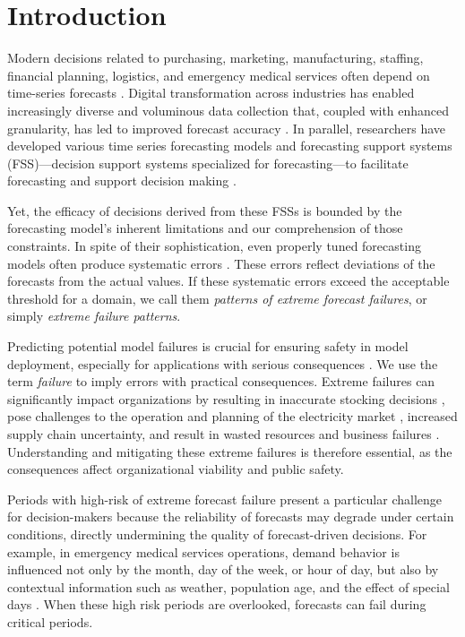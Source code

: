 \documentclass[]{interact}
\theoremstyle{plain}
\theoremstyle{definition}
\theoremstyle{remark}
\begin{document}

\section{Introduction}
\label{sec:Intro}
Modern decisions related to purchasing, marketing, manufacturing, staffing, financial planning, logistics, and emergency medical services often depend on time-series forecasts \citep{abreu2023}. Digital transformation across industries has enabled increasingly diverse and voluminous data collection that, coupled with enhanced granularity, has led to improved forecast accuracy \citep{chae2024}. In parallel, researchers have developed various time series forecasting models and forecasting support systems (FSS)---decision support systems specialized for forecasting---to facilitate forecasting and support decision making \citep{petropoulos2022}.

Yet, the efficacy of decisions derived from these FSSs is bounded by the forecasting model's inherent limitations and our comprehension of those constraints. In spite of their sophistication, even properly tuned forecasting models often produce systematic errors \citep{eyuboglu2022}. These errors reflect deviations of the forecasts from the actual values. If these systematic errors exceed the acceptable threshold for a domain, we call them \emph{patterns of extreme forecast failures}, or simply \emph{extreme failure patterns}.

Predicting potential model failures is crucial for ensuring safety in model deployment, especially for applications with serious consequences \citep{tsiligkaridis2021}. We use the term \emph{failure} to imply errors with practical consequences. Extreme failures can significantly impact organizations by resulting in inaccurate stocking decisions \citep{boylan2021}, pose challenges to the operation and planning of the electricity market \citep{zhu2025}, increased supply chain uncertainty, and result in wasted resources and business failures \citep{chae2024}. Understanding and mitigating these extreme failures is therefore essential, as the consequences affect organizational viability and public safety.

Periods with high-risk of extreme forecast failure present a particular challenge for decision-makers because the reliability of forecasts may degrade under certain conditions, directly undermining the quality of forecast-driven decisions. For example, in emergency medical services operations, demand behavior is influenced not only by the month, day of the week, or hour of  day, but also by contextual information such as weather, population age, and the effect of special days \citep{abreu2023}. When these high risk periods are overlooked, forecasts can fail during critical periods.
\end{document}
